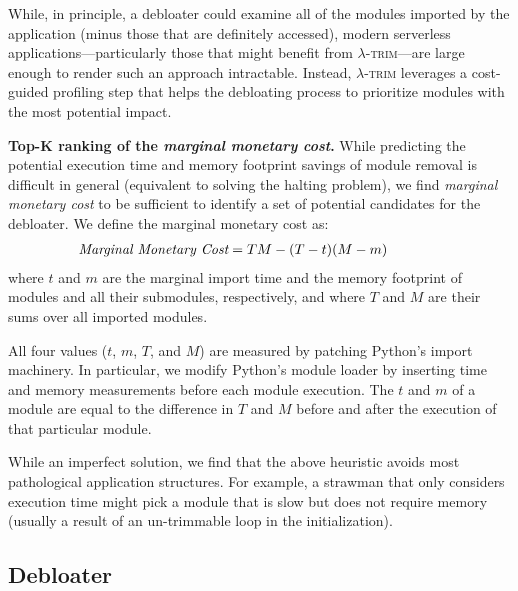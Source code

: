 \documentclass[sigplan,nonacm]{acmart}
\newcommand{\sys}{\textsc{\ensuremath{\lambda}-trim}\xspace}
\newcommand{\heading}[1]{\vspace{4pt}\noindent\textbf{#1.}}
\newcounter{example}
\begin{document}
While, in principle, a debloater could examine all of the modules imported by the application (minus those that are definitely accessed), modern serverless applications---particularly those that might benefit from \sys---are large enough to render such an approach intractable.
Instead, \sys leverages a cost-guided profiling step that helps the debloating process to prioritize modules with the most potential impact.

\heading{Top-K ranking of the \textit{marginal monetary cost}}
While predicting the potential execution time and memory footprint savings of module removal is difficult in general (equivalent to solving the halting problem), 
we find \textit{marginal monetary cost} to be sufficient to identify a set of potential candidates for the debloater.
We define the marginal monetary cost as:
\vspace{-0.15em}
\begin{align}
\hspace*{-1cm} \textit{Marginal Monetary Cost} &= T M - (T-t)(M-m)\label{eq:impact}
\end{align}
where $t$ and $m$ are the marginal import time and the memory footprint of modules and all their submodules, respectively, and where $T$ and $M$ are their sums over all imported modules.

All four values ($t$, $m$, $T$, and $M$) are measured by patching Python's import machinery.
In particular, we modify Python's module loader by inserting time and memory measurements before each module execution.
The $t$ and $m$ of a module are equal to the difference in $T$ and $M$ before and after the execution of that particular module.

While an imperfect solution, we find that the above heuristic avoids most pathological application structures.
For example, a strawman that only considers execution time might pick a module that is slow but does not require memory (usually a result of an un-trimmable loop in the initialization).






















 
\subsection{Debloater}\label{sec:debloat}
\end{document}
